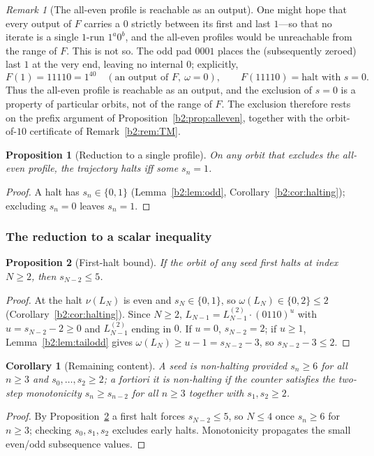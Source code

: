 \documentclass[a4paper]{article}
\theoremstyle{plain}
\newtheorem{proposition}{Proposition}[subsection]
\newtheorem{corollary}{Corollary}[subsection]
\theoremstyle{definition}
\theoremstyle{remark}
\newtheorem{remark}{Remark}[subsection]
\begin{document}
\begin{remark}[The all-even profile is reachable as an output]\label{b2:rem:rem18}
One might hope that every output of $F$ carries a $0$ strictly between its first and last $1$---so that no iterate is a single $1$-run $1^a0^b$, and the all-even profiles would be unreachable from the range of $F$. This is not so. The odd pad $0001$ places the (subsequently zeroed) last $1$ at the very end, leaving no internal $0$; explicitly,
\[ F(1)=11110=1^40\quad(\text{an output of }F,\ \omega=0),\qquad F(11110)=\text{halt with }s=0. \]
Thus the all-even profile is reachable as an output, and the exclusion of $s=0$ is a property of particular orbits, not of the range of $F$. The exclusion therefore rests on the prefix argument of Proposition~\ref{b2:prop:alleven}, together with the orbit-of-$10$ certificate of Remark~\ref{b2:rem:TM}.
\end{remark}

\begin{proposition}[Reduction to a single profile]\label{b2:prop:single}
On any orbit that excludes the all-even profile, the trajectory halts iff some $s_n=1$.
\end{proposition}
\begin{proof}
A halt has $s_n\in\{0,1\}$ (Lemma~\ref{b2:lem:odd}, Corollary~\ref{b2:cor:halting}); excluding $s_n=0$ leaves $s_n=1$.
\end{proof}

\subsubsection{The reduction to a scalar inequality}\label{b2:sec:reduction}
\begin{proposition}[First-halt bound]\label{b2:prop:firsthalt}
If the orbit of any seed first halts at index $N\ge 2$, then $s_{N-2}\le 5$.
\end{proposition}
\begin{proof}
At the halt $\nu(L_N)$ is even and $s_N\in\{0,1\}$, so $\omega(L_N)\in\{0,2\}\le 2$ (Corollary~\ref{b2:cor:halting}). Since $N\ge 2$, $L_{N-1}=L^{(2)}_{N-1}\cdot(0110)^u$ with $u=s_{N-2}-2\ge 0$ and $L^{(2)}_{N-1}$ ending in $0$. If $u=0$, $s_{N-2}=2$; if $u\ge 1$, Lemma~\ref{b2:lem:tailodd} gives $\omega(L_N)\ge u-1=s_{N-2}-3$, so $s_{N-2}-3\le 2$.
\end{proof}

\begin{corollary}[Remaining content]\label{b2:cor:remaining}
A seed is non-halting provided $s_n\ge 6$ for all $n\ge 3$ and $s_0,\dots,s_2\ge 2$; a fortiori it is non-halting if the counter satisfies the two-step monotonicity $s_n\ge s_{n-2}$ for all $n\ge 3$ together with $s_1,s_2\ge 2$.
\end{corollary}
\begin{proof}
By Proposition~\ref{b2:prop:firsthalt} a first halt forces $s_{N-2}\le 5$, so $N\le 4$ once $s_n\ge 6$ for $n\ge 3$; checking $s_0,s_1,s_2$ excludes early halts. Monotonicity propagates the small even/odd subsequence values.
\end{proof}
\end{document}
